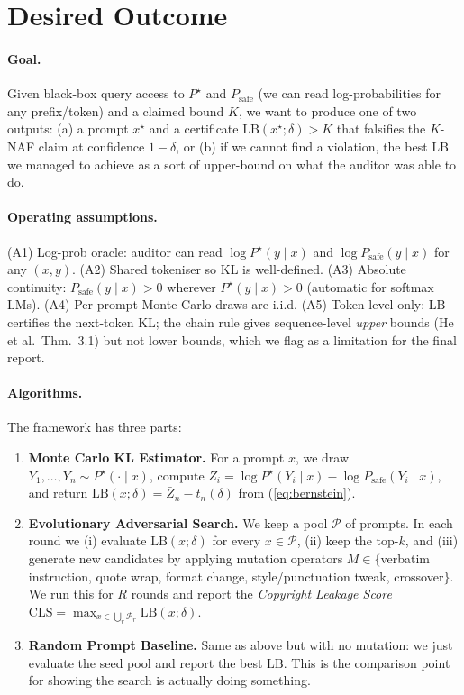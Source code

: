 \documentclass{article}
\begin{document}
\section{Desired Outcome}
\label{sec:outcome}

\paragraph{Goal.}
Given black-box query access to $P^\star$ and $P_{\mathrm{safe}}$ (we can read log-probabilities for any prefix/token) and a claimed bound $K$, we want to produce one of two outputs: (a) a prompt $x^\star$ and a certificate $\mathrm{LB}(x^\star;\delta)>K$ that falsifies the $K$-NAF claim at confidence $1-\delta$, or (b) if we cannot find a violation, the best $\mathrm{LB}$ we managed to achieve as a sort of upper-bound on what the auditor was able to do.

\paragraph{Operating assumptions.}
(A1) Log-prob oracle: auditor can read $\log P^\star(y\mid x)$ and $\log P_{\mathrm{safe}}(y\mid x)$ for any $(x,y)$. (A2) Shared tokeniser so KL is well-defined. (A3) Absolute continuity: $P_{\mathrm{safe}}(y\mid x)>0$ wherever $P^\star(y\mid x)>0$ (automatic for softmax LMs). (A4) Per-prompt Monte Carlo draws are i.i.d. (A5) Token-level only: $\mathrm{LB}$ certifies the next-token KL; the chain rule gives sequence-level \emph{upper} bounds (He et al.\ Thm.~3.1) but not lower bounds, which we flag as a limitation for the final report.

\paragraph{Algorithms.}
The framework has three parts:
\begin{enumerate}
  \item \textbf{Monte Carlo KL Estimator.} For a prompt $x$, we draw $Y_1,\ldots,Y_n\sim P^\star(\cdot\mid x)$, compute $Z_i=\log P^\star(Y_i\mid x)-\log P_{\mathrm{safe}}(Y_i\mid x)$, and return $\mathrm{LB}(x;\delta)=\bar{Z}_n-t_n(\delta)$ from (\ref{eq:bernstein}).
  \item \textbf{Evolutionary Adversarial Search.} We keep a pool $\mathcal{P}$ of prompts. In each round we (i) evaluate $\mathrm{LB}(x;\delta)$ for every $x\in\mathcal{P}$, (ii) keep the top-$k$, and (iii) generate new candidates by applying mutation operators $M\in\{$verbatim instruction, quote wrap, format change, style/punctuation tweak, crossover$\}$. We run this for $R$ rounds and report the \emph{Copyright Leakage Score} $\mathrm{CLS}=\max_{x\in\bigcup_r\mathcal{P}_r}\mathrm{LB}(x;\delta)$.
  \item \textbf{Random Prompt Baseline.} Same as above but with no mutation: we just evaluate the seed pool and report the best $\mathrm{LB}$. This is the comparison point for showing the search is actually doing something.
\end{enumerate}
\end{document}
